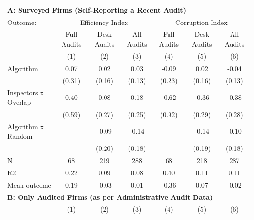 \begin{tabular}{lccc|ccc} \toprule
\multicolumn{7}{l}{\textbf{A: Surveyed Firms (Self-Reporting a Recent Audit)}} \\ \multicolumn{1}{l}{Outcome:} & \multicolumn{3}{c}{Efficiency Index} & \multicolumn{3}{c}{Corruption Index} \\ \multicolumn{1}{l}{} & Full Audits & Desk Audits & All Audits & Full Audits & Desk Audits & All Audits \\ \multicolumn{1}{l}{} & (1) & (2) & (3) & (4) & (5) & (6) \\ \midrule
Algorithm   &        0.07         &        0.02         &        0.03         &       -0.09         &        0.02         &       -0.04         \\
            &      (0.31)         &      (0.16)         &      (0.13)         &      (0.23)         &      (0.16)         &      (0.13)         \\
\addlinespace
Inspectors x Overlap&        0.40         &        0.08         &        0.18         &       -0.62         &       -0.36         &       -0.38         \\
            &      (0.59)         &      (0.27)         &      (0.25)         &      (0.92)         &      (0.29)         &      (0.28)         \\
\addlinespace
Algorithm x Random&                     &       -0.09         &       -0.14         &                     &       -0.14         &       -0.10         \\
            &                     &      (0.20)         &      (0.18)         &                     &      (0.19)         &      (0.18)         \\
\midrule
N           &          68         &         219         &         288         &          68         &         218         &         287         \\
R2          &        0.22         &        0.09         &        0.08         &        0.40         &        0.11         &        0.11         \\
Mean outcome&        0.19         &       -0.03         &        0.01         &       -0.36         &        0.07         &       -0.02         \\

\midrule \multicolumn{7}{l}{\textbf{B: Only Audited Firms (as per Administrative Audit Data)}} \\ \multicolumn{1}{l}{} & (1) & (2) & (3) & (4) & (5) & (6) \\ \midrule


\end{tabular}

